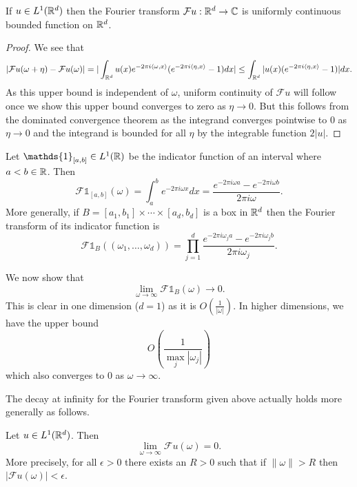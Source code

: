 \documentclass[twoside, a4paper, 10pt]{amsart}
\begin{document}
\begin{prop} If $u \in L^1(\mathbb{R}^d)$ then the Fourier transform $\mathcal{F}u:\mathbb{R}^d \to \mathbb{C}$ is  uniformly continuous bounded function on $\mathbb{R}^d$.

\end{prop}

\begin{proof} We see that $$|\mathcal{F}u(\omega + \eta) - \mathcal{F}u(\omega)| = |\int_{\mathbb{R}^d} u(x) e^{-2\pi i \langle \omega, x \rangle }(e^{-2\pi i \langle \eta, x \rangle}  - 1)dx| \leq \int_{\mathbb{R}^d} |u(x) (e^{-2\pi i \langle \eta, x \rangle}  - 1) |dx.$$ As this upper bound is independent of $\omega$, uniform continuity of $\mathcal{F}u$ will follow once we show this upper bound converges to zero as $\eta \to 0$. But this follows from the dominated convergence theorem as the integrand converges pointwise to $0$ as $\eta \to 0$ and the integrand is bounded for all $\eta$ by the integrable function $2|u| $. \end{proof}

\begin{eg} Let $\mathds{1}_{[a,b]} \in L^1(\bR)$ be the indicator function of an interval where $a<b \in \mathbb{R}$. Then $$\mathcal{F}\mathds{1}_{[a,b]}(\omega) = \int_a^b e^{-2\pi i \omega x} dx = \frac{e^{-2\pi i \omega a} - e^{-2\pi i \omega b}}{2\pi i \omega}.    $$ More generally, if $B = [a_1, b_1] \times \cdots \times [a_d, b_d]$ is a  box in $\mathbb{R}^d$ then the Fourier transform of its indicator function is $$\mathcal{F}\mathds{1}_B ((\omega_1, \ldots, \omega_d)) = \prod_{j=1}^d  \frac{e^{-2\pi i \omega_j a} - e^{-2\pi i \omega_j b}}{2\pi i \omega_j}.$$

We now show that $$\lim_{\omega \to \infty} \mathcal{F}\mathds{1}_B(\omega)  \to 0.$$ This is clear in one dimension ($d=1$) as it is $O(\frac{1}{|\omega|})$. In higher dimensions, we have the upper bound $$O(\frac{1}{\max_{j} |\omega_j|})$$ which also converges to $0$ as $\omega \to \infty$. 

\end{eg}

The decay at infinity for the Fourier transform given above actually holds more generally as follows.

\begin{thm} Let $u \in L^1(\mathbb{R}^d)$. Then $$\lim_{\omega \to \infty} \mathcal{F}u(\omega) = 0.$$ More precisely, for all $\epsilon>0$ there exists an $R>0$ such that if $\|\omega \|>R$ then $|\mathcal{F}u(\omega)| < \epsilon$.

\end{thm}
\end{document}
